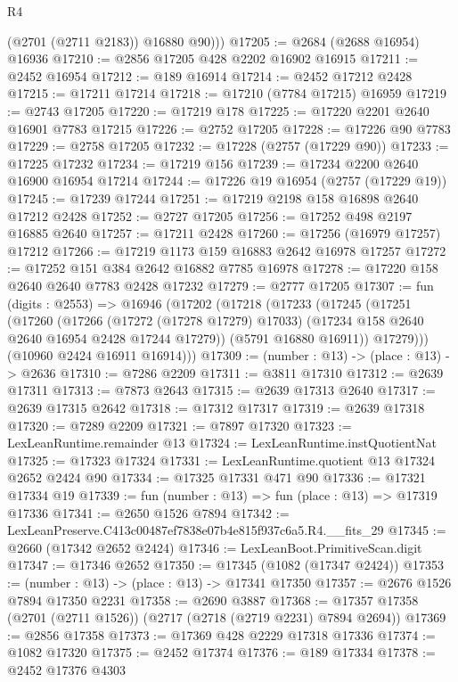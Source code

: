 \begin{lexlean}{R4}
\begin{coremodule}
          (@2701 (@2711 @2183))
          @16880
          @90)))
@17205 := @2684 (@2688 @16954) @16936
@17210 := @2856 @17205 @428 @2202 @16902 @16915
@17211 := @2452 @16954
@17212 := @189 @16914
@17214 := @2452 @17212 @2428
@17215 := @17211 @17214
@17218 := @17210 (@7784 @17215) @16959
@17219 := @2743 @17205
@17220 := @17219 @178
@17225 := @17220 @2201 @2640 @16901 @7783 @17215
@17226 := @2752 @17205
@17228 := @17226 @90 @7783
@17229 := @2758 @17205
@17232 := @17228 (@2757 (@17229 @90))
@17233 := @17225 @17232
@17234 := @17219 @156
@17239 := @17234 @2200 @2640 @16900 @16954 @17214
@17244 := @17226 @19 @16954 (@2757 (@17229 @19))
@17245 := @17239 @17244
@17251 := @17219 @2198 @158 @16898 @2640 @17212 @2428
@17252 := @2727 @17205
@17256 := @17252 @498 @2197 @16885 @2640
@17257 := @17211 @2428
@17260 := @17256 (@16979 @17257) @17212
@17266 := @17219 @1173 @159 @16883 @2642 @16978 @17257
@17272 := @17252 @151 @384 @2642 @16882 @7785 @16978
@17278 := @17220 @158 @2640 @2640 @7783 @2428 @17232
@17279 := @2777 @17205
@17307 := fun (digits : @2553) =>
  @16946
    (@17202
      (@17218
        (@17233
          (@17245
            (@17251
              (@17260
                (@17266
                  (@17272 (@17278 @17279) @17033)
                  (@17234 @158 @2640 @2640 @16954 @2428 @17244 @17279))
                (@5791 @16880 @16911))
              @17279)))
        (@10960 @2424 @16911 @16914)))
@17309 := (number : @13) -> (place : @13) -> @2636
@17310 := @7286 @2209
@17311 := @3811 @17310
@17312 := @2639 @17311
@17313 := @7873 @2643
@17315 := @2639 @17313 @2640
@17317 := @2639 @17315 @2642
@17318 := @17312 @17317
@17319 := @2639 @17318
@17320 := @7289 @2209
@17321 := @7897 @17320
@17323 := LexLeanRuntime.remainder @13
@17324 := LexLeanRuntime.instQuotientNat
@17325 := @17323 @17324
@17331 := LexLeanRuntime.quotient @13 @17324 @2652 @2424 @90
@17334 := @17325 @17331 @471 @90
@17336 := @17321 @17334 @19
@17339 := fun (number : @13) => fun (place : @13) => @17319 @17336
@17341 := @2650 @1526 @7894
@17342 := LexLeanPreserve.C413c00487ef7838e07b4e815f937c6a5.R4.__fits_29
@17345 := @2660 (@17342 @2652 @2424)
@17346 := LexLeanBoot.PrimitiveScan.digit
@17347 := @17346 @2652
@17350 := @17345 (@1082 (@17347 @2424))
@17353 := (number : @13) -> (place : @13) -> @17341 @17350
@17357 := @2676 @1526 @7894 @17350 @2231
@17358 := @2690 @3887
@17368 := @17357 @17358 (@2701 (@2711 @1526)) (@2717 (@2718 (@2719 @2231) @7894 @2694))
@17369 := @2856 @17358
@17373 := @17369 @428 @2229 @17318 @17336
@17374 := @1082 @17320
@17375 := @2452 @17374
@17376 := @189 @17334
@17378 := @2452 @17376 @4303

\end{coremodule}
\end{lexlean}
